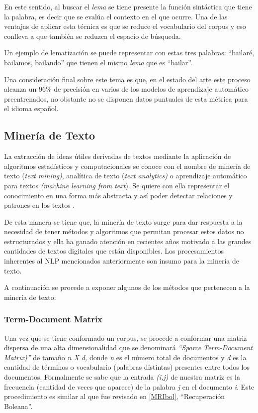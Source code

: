 \documentclass[
  12pt,
  openany]{book}
\begin{document}
En este sentido, al buscar el \emph{lema} se tiene presente la función sintáctica que tiene la palabra, es decir que se evalúa el contexto en el que ocurre. Una de las ventajas de aplicar esta técnica es que se reduce el vocabulario del corpus y eso conlleva a que también se reduzca el espacio de búsqueda.

Un ejemplo de lematización se puede representar con estas tres palabras: ``bailaré, bailamos, bailando'' que tienen el mismo \emph{lema} que es ``bailar''.

Una consideración final sobre este tema es que, en el estado del arte este proceso alcanza un 96\% de precisión en varios de los modelos de aprendizaje automático preentrenados, no obstante no se disponen datos puntuales de esta métrica para el idioma español.

\hypertarget{textmin}{%
\subsection{Minería de Texto}\label{textmin}}

La extracción de ideas útiles derivadas de textos mediante la aplicación de algoritmos estadísticos y computacionales se conoce con el nombre de minería de texto (\emph{text mining)}, analítica de texto (\emph{text analytics)} o aprendizaje automático para textos \emph{(machine learning from text}). Se quiere con ella representar el conocimiento en una forma más abstracta y así poder detectar relaciones y patrones en los textos \citep{aggarwal2018a}.

De esta manera se tiene que, la minería de texto surge para dar respuesta a la necesidad de tener métodos y algoritmos que permitan procesar estos datos no estructurados \citep{miningt2012} y ella ha ganado atención en recientes años motivado a las grandes cantidades de textos digitales que están disponibles. Los procesamientos inherentes al NLP mencionados anteriormente son insumo para la minería de texto.

A continuación se procede a exponer algunos de los métodos que pertenecen a la minería de texto:

\hypertarget{tdm}{%
\subsubsection{Term-Document Matrix}\label{tdm}}

Una vez que se tiene conformado un corpus, se procede a conformar una matriz dispersa de una alta dimensionalidad que se denominará \emph{``Sparce Term-Document Matrix)''} de tamaño \emph{n X d,} donde \emph{n} es el número total de documentos y \emph{d} es la cantidad de términos o vocabulario (palabras distintas) presentes entre todos los documentos. Formalmente se sabe que la entrada \emph{(i,j)} de nuestra matriz es la frecuencia (cantidad de veces que aparece) de la palabra \emph{j} en el documento \emph{i}. Este procedimiento es similar al que fue revisado en \ref{MRIbol}, ``Recuperación Boleana''.
\end{document}
